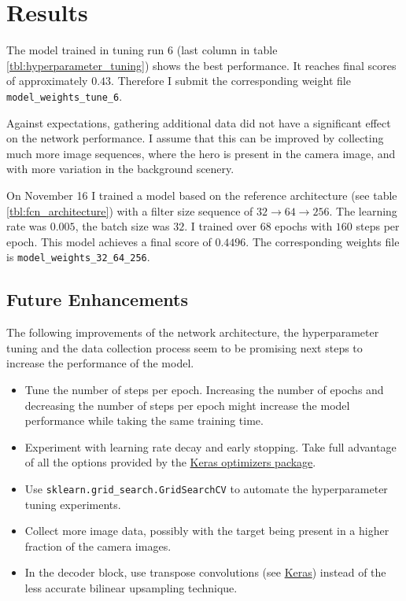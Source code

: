 \documentclass[11pt, onecolumn, oneside, reqno]{article}
\begin{document}
{{{{\section{Results}
The model trained in tuning run $6$ (last column in table \ref{tbl:hyperparameter_tuning}) shows the best performance. It reaches final scores of approximately $0.43$. Therefore I submit the corresponding weight file \texttt{model\_weights\_tune\_6}.

Against expectations, gathering additional data did not have a significant effect on the network performance. I assume that this can be improved by collecting much more image sequences, where the hero is present in the camera image, and with more variation in the background scenery.

On November 16 I trained a model based on the reference architecture (see table \ref{tbl:fcn_architecture}) with a filter size sequence of $32 \rightarrow 64 \rightarrow 256$. The learning rate was $0.005$, the batch size was $32$. I trained over $68$ epochs with $160$ steps per epoch. This model achieves a final score of $0.4496$. The corresponding weights file is \texttt{model\_weights\_32\_64\_256}.

\subsection{Future Enhancements}
The following improvements of the network architecture, the hyperparameter tuning and the data collection process seem to be promising next steps to increase the performance of the model.
\begin{itemize}
\item Tune the number of steps per epoch. Increasing the number of epochs and decreasing the number of steps per epoch might increase the model performance while taking the same training time.
\item Experiment with learning rate decay and early stopping. Take full advantage of all the options provided by the \href{https://keras.io/optimizers/}{Keras optimizers package}.
\item Use \texttt{sklearn.grid\_search.GridSearchCV} to automate the hyperparameter tuning experiments.
\item Collect more image data, possibly with the target being present in a higher fraction of the camera images.
\item In the decoder block, use transpose convolutions (see \href{https://keras.io/layers/convolutional/#conv2dtranspose}{Keras}) instead of the less accurate bilinear upsampling technique.
\end{itemize}

}}}}
\end{document}
